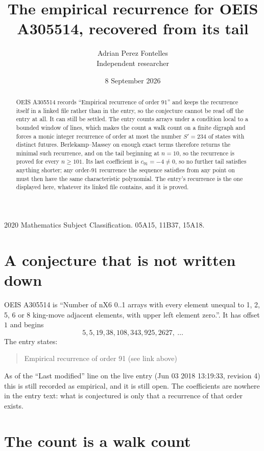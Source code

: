 \documentclass[11pt,a4paper]{article}
\title{The empirical recurrence for OEIS A305514, recovered from its tail}
\author{Adrian Perez Fontelles\\ \small Independent researcher}
\date{8 September 2026}
\theoremstyle{plain}
\theoremstyle{definition}
\begin{document}
\maketitle

\begin{abstract}
OEIS A305514 records ``Empirical recurrence of order $91$'' and keeps the recurrence itself in
a linked file rather than in the entry, so the conjecture cannot be read off the entry at all.
It can still be settled. The entry counts arrays under a condition local to a bounded window of
lines, which makes the count a walk count on a finite digraph and forces a monic integer
recurrence of order at most the number $S'=234$ of states with distinct futures. Berlekamp--Massey on
enough exact terms therefore returns the minimal such recurrence, and on the tail beginning at $n=10$, so the recurrence is proved for every $n\ge101$.
Its last coefficient is $c_{91}=-4\neq0$, so no further tail satisfies anything
shorter; any order-$91$ recurrence the sequence satisfies from any point on must then have
the same characteristic polynomial. The entry's recurrence is the one displayed here, whatever
its linked file contains, and it is proved.
\end{abstract}

\noindent\small 2020 Mathematics Subject Classification. 05A15, 11B37, 15A18.\normalsize

\section{A conjecture that is not written down}

OEIS A305514 is ``Number of nX6 0..1 arrays with every element unequal to 1, 2, 5, 6 or 8 king-move adjacent elements, with upper left element zero.''. It has offset $1$ and begins
\[
5, 5, 19, 38, 108, 343, 925, 2627,\ \dots
\]
The entry states:
\begin{quote}
Empirical recurrence of order 91 (see link above)
\end{quote}
As of the ``Last modified'' line on the live entry (Jun 03 2018 13:19:33, revision 4)
this is still recorded as empirical, and it is still open. The coefficients are nowhere in the
entry text: what is conjectured is only that a recurrence of that order exists.

\section{The count is a walk count}
\end{document}
